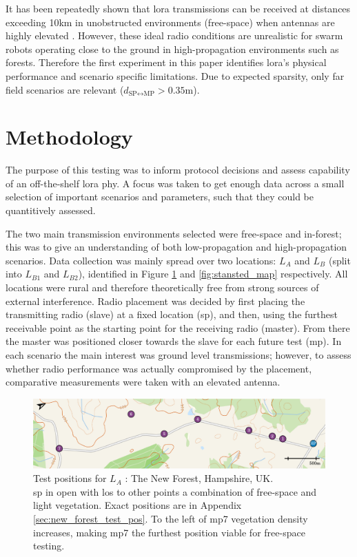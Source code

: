 It has been repeatedly shown that \ac{lora} transmissions can be received at distances exceeding 10km in  unobstructed environments (free-space) when antennas are highly elevated \cite{3YP:LORA_RANGE_REVIEW}. However, these ideal radio conditions are unrealistic for swarm robots operating close to the ground in high-propagation environments such as forests. Therefore the first experiment in this paper identifies \ac{lora}'s physical performance and scenario specific limitations. Due to expected sparsity, only far field scenarios are relevant ($d_{\text{SP}\leftrightarrow \text{MP}} >  0.35$m).


\section{Methodology}
The purpose of this testing was to inform protocol decisions and assess capability of an off-the-shelf \ac{lora} \ac{phy}. A focus was taken to get enough data across a small selection of important scenarios and parameters, such that they could be quantitively assessed. 

 The two main transmission environments selected were free-space and in-forest; this was to give an understanding of both low-propagation and high-propagation scenarios. Data collection was mainly spread over two locations: \textbf{$L_{A}$} and \textbf{$L_{B}$} (split into \textbf{$L_{B1}$} and \textbf{$L_{B2}$}), identified in Figure \ref{fig:new_forest_map} and \ref{fig:stansted_map} respectively. All locations were rural and therefore theoretically free from strong sources of external interference. Radio placement was decided by first placing the transmitting radio (slave) at a fixed location (\ac{sp}), and then, using the furthest receivable point as the starting point for the receiving radio (master). From there the master was positioned closer towards the slave for each future test (\ac{mp}). In each scenario the main interest was ground level transmissions; however, to assess whether radio performance was actually compromised by the placement, comparative measurements were taken with an elevated antenna. 
 
  \begin{figure}[H]
    \centering
    \includegraphics[width=\textwidth]{Figures/new_forest_light}
    \caption[Test Location: The New Forest, Hampshire, UK]{
    Test positions for \textbf{$L_A$} :  The New Forest, Hampshire, UK.\protect\footnotemark[1] \\
    \ac{sp} in open with \ac{los} to other points a combination of free-space and light vegetation. Exact positions are in Appendix \ref{sec:new_forest_test_pos}. To the left of \ac{mp}7 vegetation density increases,  making \ac{mp}7 the furthest position viable for free-space testing.
    }
    \label{fig:new_forest_map}
\end{figure}

